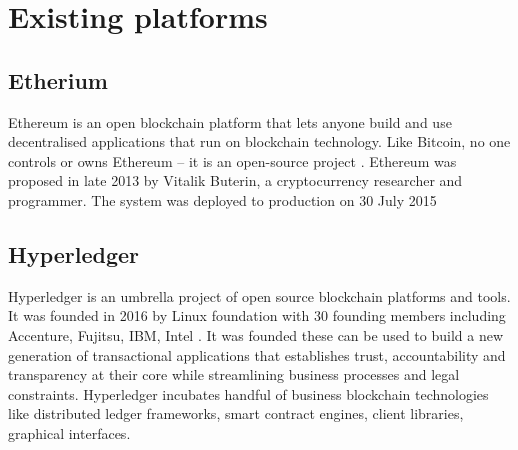 \section{Existing platforms}

\subsection{Etherium}
Ethereum is an open blockchain platform that lets anyone build and use decentralised applications that run on blockchain technology. Like Bitcoin, no one controls or owns Ethereum – it is an open-source project \cite{eth_docs}. Ethereum was proposed in late 2013 by Vitalik Buterin, a cryptocurrency researcher and programmer. The system was deployed to production on 30 July 2015

\subsection{Hyperledger}
Hyperledger is an umbrella project of open source blockchain platforms and tools. It was founded in 2016 by Linux foundation with 30 founding members including Accenture, Fujitsu, IBM, Intel \cite{hyperledger_founding}. It was founded these can be used to build a new generation of transactional applications that establishes trust, accountability and transparency at their core while streamlining business processes and legal constraints. Hyperledger incubates handful of business blockchain technologies like distributed ledger frameworks, smart contract engines, client libraries, graphical interfaces. 


